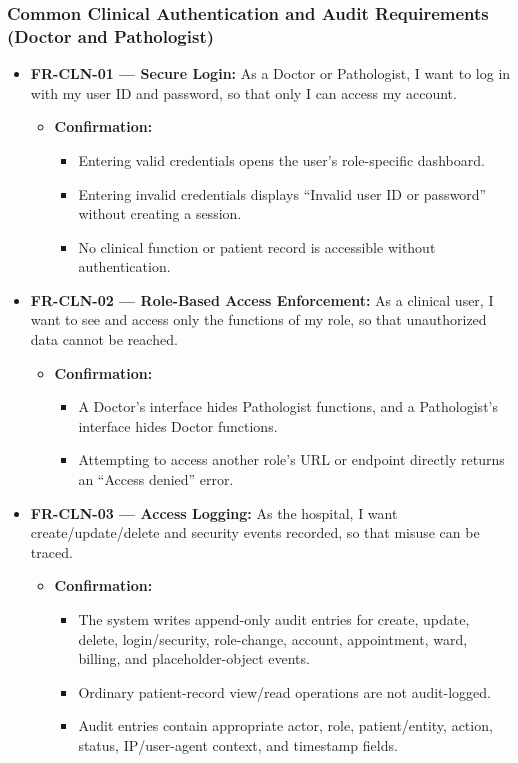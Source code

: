 \documentclass[11pt,a4paper]{article}
\begin{document}
\subsubsection{Common Clinical Authentication and Audit Requirements (Doctor and Pathologist)}

\begin{itemize}
    \item \textbf{FR-CLN-01 — Secure Login:} As a Doctor or Pathologist, I want to log in with my user ID and password, so that only I can access my account.
    \begin{itemize}
        \item \textbf{Confirmation:}
        \begin{itemize}
            \item Entering valid credentials opens the user's role-specific dashboard.
            \item Entering invalid credentials displays ``Invalid user ID or password'' without creating a session.
            \item No clinical function or patient record is accessible without authentication.
        \end{itemize}
    \end{itemize}

    \item \textbf{FR-CLN-02 — Role-Based Access Enforcement:} As a clinical user, I want to see and access only the functions of my role, so that unauthorized data cannot be reached.
    \begin{itemize}
        \item \textbf{Confirmation:}
        \begin{itemize}
            \item A Doctor's interface hides Pathologist functions, and a Pathologist's interface hides Doctor functions.
            \item Attempting to access another role's URL or endpoint directly returns an ``Access denied'' error.
        \end{itemize}
    \end{itemize}

    \item \textbf{FR-CLN-03 — Access Logging:} As the hospital, I want create/update/delete and security events recorded, so that misuse can be traced.
    \begin{itemize}
        \item \textbf{Confirmation:}
        \begin{itemize}
            \item The system writes append-only audit entries for create, update, delete, login/security, role-change, account, appointment, ward, billing, and placeholder-object events.
            \item Ordinary patient-record view/read operations are not audit-logged.
            \item Audit entries contain appropriate actor, role, patient/entity, action, status, IP/user-agent context, and timestamp fields.
        \end{itemize}
    \end{itemize}
\end{itemize}
\end{document}
